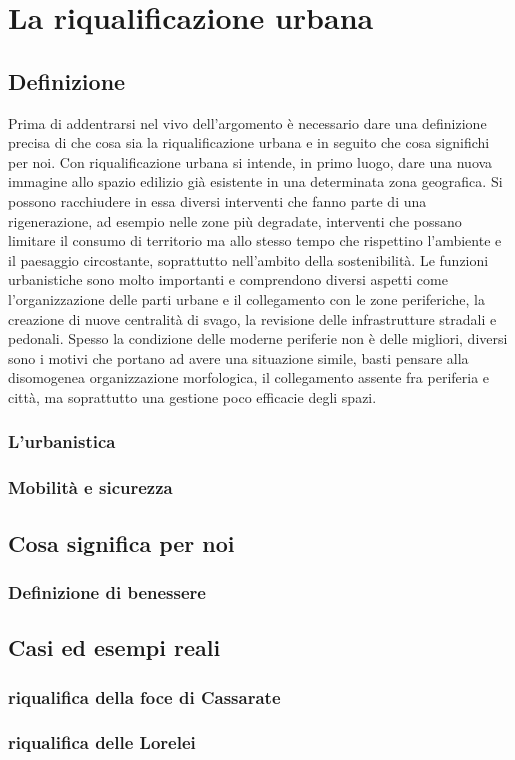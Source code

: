 \section{La riqualificazione urbana}
\subsection{Definizione}
Prima di addentrarsi nel vivo dell’argomento è necessario dare una definizione precisa di che cosa sia la riqualificazione urbana e in seguito che cosa significhi per noi.
Con riqualificazione urbana si intende, in primo luogo, dare una nuova immagine allo spazio edilizio già esistente in una determinata zona geografica. Si possono racchiudere in essa diversi interventi che fanno parte di una rigenerazione, ad esempio nelle zone più degradate, interventi che possano limitare il consumo di territorio ma allo stesso tempo che rispettino l’ambiente e il paesaggio circostante, soprattutto nell’ambito della sostenibilità. Le funzioni urbanistiche sono molto importanti e comprendono diversi aspetti come l’organizzazione delle parti urbane e il collegamento con le zone periferiche, la creazione di nuove centralità di svago, la revisione delle infrastrutture stradali e pedonali.
Spesso la condizione delle moderne periferie non è delle migliori, diversi sono i motivi che portano ad avere una situazione simile, basti pensare alla disomogenea organizzazione morfologica, il collegamento assente fra periferia e città, ma soprattutto una gestione poco efficacie degli spazi. 

\subsubsection{L'urbanistica}

\subsubsection{Mobilità e sicurezza}

\subsection{Cosa significa per noi}
\subsubsection{Definizione di benessere}

\subsection{Casi ed esempi reali}
\subsubsection{riqualifica della foce di Cassarate}
\subsubsection{riqualifica delle Lorelei }